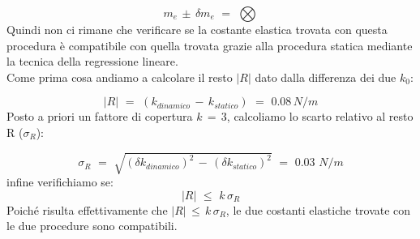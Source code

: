 \begin{equation*}
	m_e \, \pm \, \delta m_e \,\,=\,\, \bigotimes
\end{equation*}
%
Quindi non ci rimane che verificare se la costante elastica trovata con questa procedura è compatibile con quella trovata grazie alla procedura statica mediante la tecnica della regressione lineare.\\
Come prima cosa andiamo a calcolare il resto $|R|$ dato dalla differenza dei due $k_0$:

\begin{equation*}
	|R| \,\,=\,\, (k_{dinamico} \,-\, k_{statico}) \,\,=\,\, 0.08 \, N/m
\end{equation*}
%
Posto a priori un fattore di copertura $k \,=\, 3$, calcoliamo lo scarto relativo al resto R ($\sigma_R$):

\begin{equation*}
	\sigma_R \,\,=\,\, \sqrt{(\delta k_{dinamico})^2 \,-\, (\delta k_{statico})^2} \,\,=\,\, 0.03 \,\, N/m	
\end{equation*}
%
infine verifichiamo se:
\begin{equation*}
	|R| \,\,\leq\,\, k \, \sigma_R  
\end{equation*}
%
Poiché risulta effettivamente che $|R| \,\leq\, k\,\sigma_R$, le due costanti elastiche trovate con le due procedure sono compatibili.



